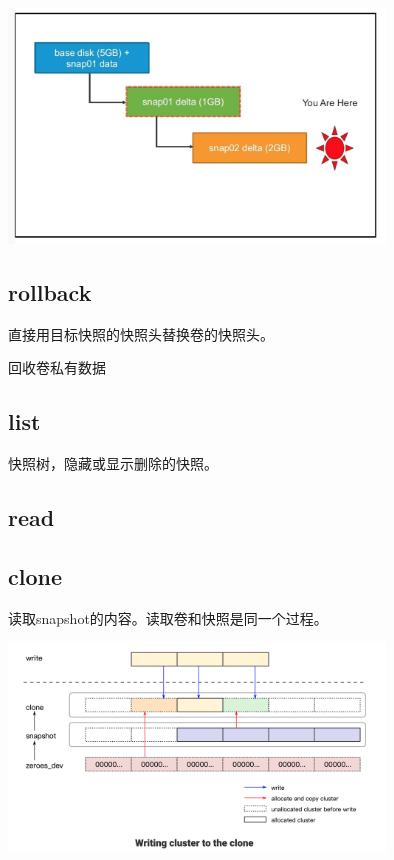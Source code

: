 \begin{center}
\includegraphics[width=10cm]{../imgs/snapshot/snap-delete-non-leaf.png}
\end{center}


\subsection{rollback}

直接用目标快照的快照头替换卷的快照头。

回收卷私有数据

\subsection{list}

快照树，隐藏或显示删除的快照。

\subsection{read}

\subsection{clone}

读取snapshot的内容。读取卷和快照是同一个过程。

\begin{center}
\includegraphics[width=10cm]{../imgs/snapshot/clone-write.png}
\end{center}

